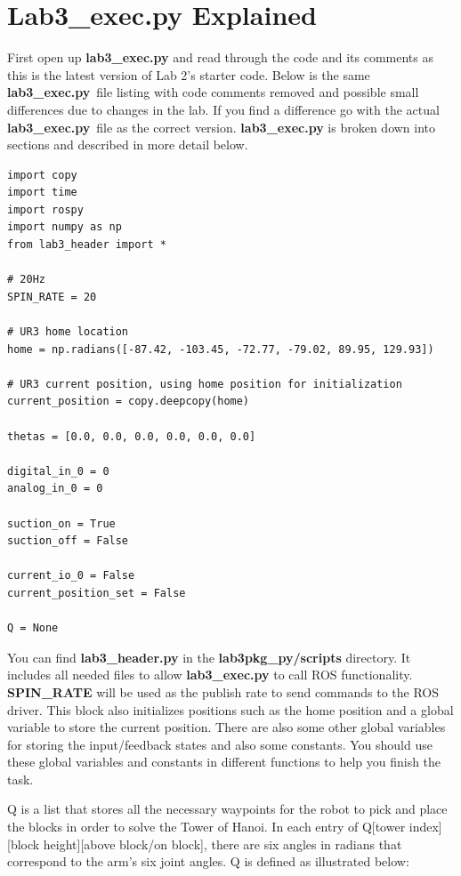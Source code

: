 \section{Lab3\_exec.py Explained}
First open up \textbf{lab3\_exec.py} and read through the code and its comments as this is the latest version of Lab 2's starter code. Below is the same \textbf{lab3\_exec.py}\
file listing with code comments removed and possible small differences due to changes in the lab.  If you find a difference go with the actual \textbf{lab3\_exec.py}\
file as the correct version.  \textbf{lab3\_exec.py} is broken down into sections and described in more detail below.  

{\footnotesize
\begin{verbatim}
import copy
import time
import rospy
import numpy as np
from lab3_header import *

# 20Hz
SPIN_RATE = 20 
    
# UR3 home location
home = np.radians([-87.42, -103.45, -72.77, -79.02, 89.95, 129.93])
    
# UR3 current position, using home position for initialization
current_position = copy.deepcopy(home)
    
thetas = [0.0, 0.0, 0.0, 0.0, 0.0, 0.0]
    
digital_in_0 = 0
analog_in_0 = 0
    
suction_on = True
suction_off = False
    
current_io_0 = False
current_position_set = False

Q = None
\end{verbatim}}

You can find \textbf{lab3\_header.py} in the \textbf{lab3pkg\_py/scripts} directory.  It includes all needed files to allow \textbf{lab3\_exec.py} to call ROS functionality.
\textbf{SPIN\_RATE} will be used as the publish rate to send commands to the ROS driver. This block also initializes positions such as the home position and a global variable to store the current position. There are also some other global variables for storing the input/feedback states and also some constants. You should use these global variables and constants in different functions to help you finish the task.

Q is a list that stores all the necessary waypoints for the robot to pick and place the blocks in order to solve the Tower of Hanoi. In each entry of Q[tower index][block height][above block/on block], there are six angles in radians that correspond to the arm's six joint angles. Q is defined as illustrated below:

